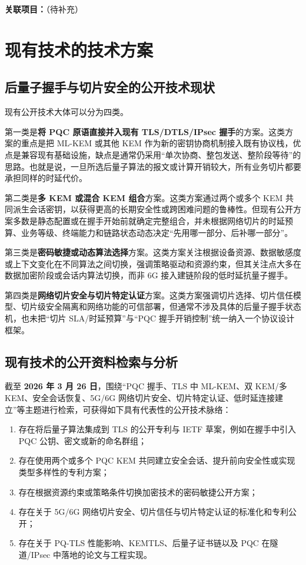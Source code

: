 \documentclass[12pt,a4paper]{article}
\begin{document}
\textbf{关联项目：}\underline{\hspace{8cm}}（待补充）

\section{现有技术的技术方案}

\subsection{后量子握手与切片安全的公开技术现状}

现有公开技术大体可以分为四类。

第一类是\textbf{将 PQC 原语直接并入现有 TLS/DTLS/IPsec 握手}的方案。这类方案的重点是把 ML-KEM 或其他 KEM 作为新的密钥协商机制接入既有协议栈，优点是兼容现有基础设施，缺点是通常仍采用“单次协商、整包发送、整阶段等待”的思路。也就是说，一旦所选后量子算法的报文或计算开销较大，所有业务切片都要承担同样的时延代价。

第二类是\textbf{多 KEM 或混合 KEM 组合}方案。这类方案通过两个或多个 KEM 共同派生会话密钥，以获得更高的长期安全性或跨困难问题的鲁棒性。但现有公开方案多数是静态配置或在握手开始前就确定完整组合，并未根据网络切片的时延预算、业务等级、终端能力和链路状态动态决定“先用哪一部分、后补哪一部分”。

第三类是\textbf{密码敏捷或动态算法选择}方案。这类方案关注根据设备资源、数据敏感度或上下文变化在不同算法之间切换，强调策略驱动和资源约束，但其关注点大多在数据加密阶段或会话内算法切换，而非 6G 接入建链阶段的低时延抗量子握手。

第四类是\textbf{网络切片安全与切片特定认证}方案。这类方案强调切片选择、切片信任模型、切片级安全隔离和网络功能的可信部署，但通常不涉及具体的后量子握手状态机，也未把“切片 SLA/时延预算”与“PQC 握手开销控制”统一纳入一个协议设计框架。

\subsection{现有技术的公开资料检索与分析}

截至 \textbf{2026 年 3 月 26 日}，围绕“PQC 握手、TLS 中 ML-KEM、双 KEM/多 KEM、安全会话恢复、5G/6G 网络切片安全、切片特定认证、低时延连接建立”等主题进行检索，可获得如下具有代表性的公开技术脉络：

\begin{enumerate}[leftmargin=2em]
    \item 存在将后量子算法集成到 TLS 的公开专利与 IETF 草案，例如在握手中引入 PQC 公钥、密文或新的命名群组；
    \item 存在使用两个或多个 PQC KEM 共同建立安全会话、提升前向安全性或实现类型多样性的专利方案；
    \item 存在根据资源约束或策略条件切换加密技术的密码敏捷公开方案；
    \item 存在关于 5G/6G 网络切片安全、切片信任与切片特定认证的标准化和专利公开；
    \item 存在关于 PQ-TLS 性能影响、KEMTLS、后量子证书链以及 PQC 在隧道/IPsec 中落地的论文与工程实现。
\end{enumerate}
\end{document}
